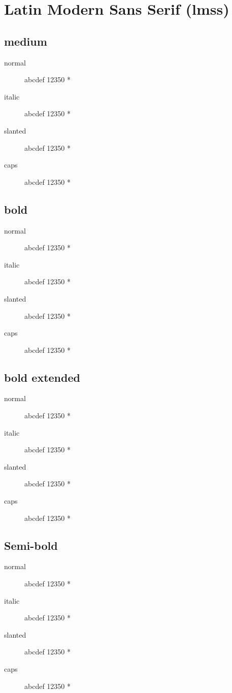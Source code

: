 \section{Latin Modern Sans Serif (lmss)}

\subsection{medium}
\begin{description}
    \item [normal]  abcdef 12350 *
    \item [italic]  abcdef 12350 *
    \item [slanted]  abcdef 12350 *
    \item [caps]  abcdef 12350 *
\end{description}
    
\subsection{bold}
\begin{description}
    \item [normal]  abcdef 12350 *
    \item [italic]  abcdef 12350 *
    \item [slanted]  abcdef 12350 *
    \item [caps]  abcdef 12350 *
\end{description}
    
\subsection{bold extended}
\begin{description}
    \item [normal]  abcdef 12350 *
    \item [italic]  abcdef 12350 *
    \item [slanted]  abcdef 12350 *
    \item [caps]  abcdef 12350 *
\end{description}

\subsection{Semi-bold}
\begin{description}
    \item [normal]  abcdef 12350 *
    \item [italic]  abcdef 12350 *
    \item [slanted]  abcdef 12350 *
    \item [caps]  abcdef 12350 *
\end{description}

